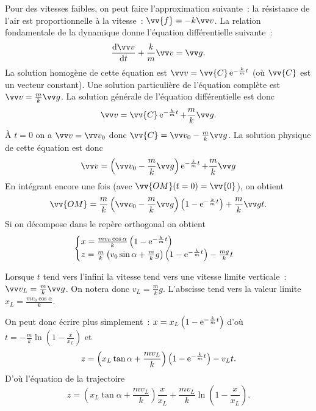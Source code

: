 Pour des vitesses faibles, on peut faire l'approximation suivante~: la 
résistance de l'air est proportionnelle à la vitesse~: \(\vv{f}=-k \vvv\). La 
relation fondamentale de la dynamique donne l'équation différentielle 
suivante~:
\begin{equation}%
  \derived{\vvv}{t}+\frac{k}{m}\vvv = \vg.
\end{equation}%
La solution homogène de cette équation est \(\vvv = \vv{C}\e^{-\frac{k}{m}t}\) 
(où \(\vv{C}\) est un vecteur constant). Une solution particulière de 
l'équation complète est \(\vvv = \frac{m}{k}\vg\). La solution générale de 
l'équation différentielle est donc
\begin{equation}%
  \vvv = \vv{C}\e^{-\frac{k}{m}t} + \frac{m}{k}\vg.
\end{equation}%
À \(t=0\) on a \(\vvv=\vvv_0\) donc \(\vv{C}=\vvv_0 - \frac{m}{k}\vg\). La 
solution physique de cette équation est donc
\begin{equation}%
  \vvv = \left( \vvv_0 - \frac{m}{k}\vg \right) \e^{-\frac{k}{m}t} + 
  \frac{m}{k}\vg
\end{equation}%
En intégrant encore une fois (avec \(\vv{OM}(t=0)=\vv{0}\)), on obtient
\begin{equation}%
  \vv{OM} = \frac{m}{k}\left(\vvv_0 - \frac{m}{k}\vg\right)\left(1 - 
  \e^{-\frac{k}{m}t}\right) + \frac{m}{k}\vg t.
\end{equation}%
Si on décompose dans le repère orthogonal on obtient
\begin{equation}%
  \begin{cases}
    x = \frac{m v_0 \cos\alpha}{k}\left(1 - \e^{-\frac{k}{m}t}\right) \\
    z = \frac{m}{k}\left(v_0\sin\alpha + \frac{m}{k}g\right) \left(1 - 
    \e^{-\frac{k}{m}t}\right) - \frac{mg}{k}t
  \end{cases}
\end{equation}%

Lorsque \(t\) tend vers l'infini la vitesse tend vers une vitesse limite 
verticale~: \(\vvv_L = \frac{m}{k}\vg\). On notera donc \(v_L = \frac{m}{k}g\). 
L'abscisse tend vers la valeur limite \(x_L = \frac{mv_0 \cos \alpha}{k}\).

On peut donc écrire plus simplement~: \(x = 
x_L\left(1-\operatorname{e}^{-\frac{k}{m}t}\right)\) d'où \(t = 
-\frac{m}{k}\ln\left(1-\frac{x}{x_L}\right)\) et
\begin{equation}%
  z = \left(x_L\tan \alpha + 
  \frac{mv_L}{k}\right)\left(1-\e^{-\frac{k}{m}t}\right) -v_L t.
\end{equation}%
D'où l'équation de la trajectoire
\begin{equation}%
  z = \left(x_L\tan \alpha + \frac{mv_L}{k}\right)\frac{x}{x_L} + \frac{m 
  v_L}{k}\ln\left(1-\frac{x}{x_L}\right).
\end{equation}%

